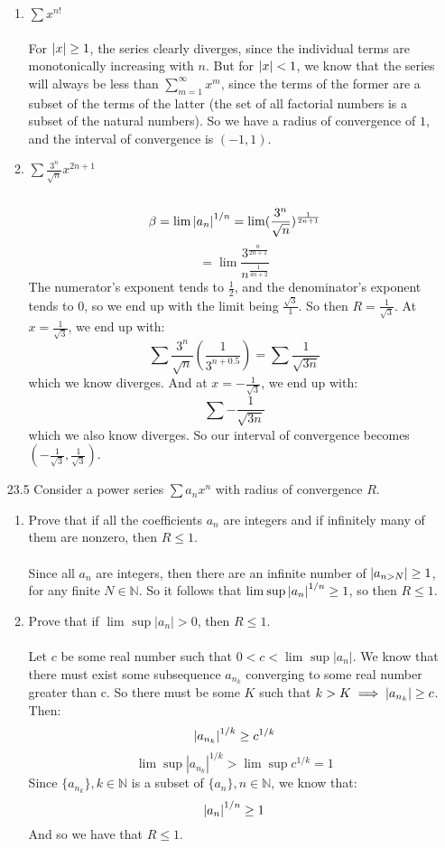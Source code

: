 \begin{enumerate}
\begin{enumerate}
      \item $\sum x^{n!}$\\\\

        For $\left\vert x \right\vert \geq 1$, the series clearly diverges, since the individual terms are monotonically increasing with $n$. But for $\left\vert x \right\vert < 1$, we know that the series will always be less than $\sum_{m=1}^\infty x^m$, since the terms of the former are a subset of the terms of the latter (the set of all factorial numbers is a subset of the natural numbers). So we have a radius of convergence of $1$, and the interval of convergence is $(-1,1)$.
      \item $\sum \frac{3^n}{\sqrt{n}} x^{2n+1}$\\\\

        $$\beta = \lim_{} \left\vert a_n \right\vert^{1/n} = \lim_{} (\frac{3^n}{\sqrt{n}})^{\frac{1}{2n+1}}$$
        $$=\lim_{} \frac{3^{\frac{n}{2n+1}}}{n^{\frac{1}{4n+2}}}$$
        The numerator's exponent tends to $\frac{1}{2}$, and the denominator's exponent tends to $0$, so we end up with the limit being $\frac{\sqrt{3}}{1}$. So then $R = \frac{1}{\sqrt{3}}$. At $x = \frac{1}{\sqrt{3}}$, we end up with:
        $$\sum \frac{3^n}{\sqrt{n}} (\frac{1}{3^{n + 0.5}}) = \sum \frac{1}{\sqrt{3n}}$$
        which we know diverges. And at $x = - \frac{1}{\sqrt{3}}$, we end up with:
        $$\sum - \frac{1}{\sqrt{3n}}$$
        which we also know diverges. So our interval of convergence becomes $(- \frac{1}{\sqrt{3}}, \frac{1}{\sqrt{3}})$.
    \end{enumerate}
  \item [23.5]
    Consider a power series $\sum a_n x^n$ with radius of convergence $R$.
    \begin{enumerate}
      \item Prove that if all the coefficients $a_n$ are integers and if infinitely many of them are nonzero, then $R \leq 1$.\\\\

        Since all $a_n$ are integers, then there are an infinite number of $\left\vert a_{n > N} \right\vert \geq 1$, for any finite $N \in \mathds{N}$. So it follows that $\lim_{} \sup \left\vert a_n \right\vert^{1/n} \geq 1$, so then $R \leq 1$.
      \item Prove that if $\lim_{} \sup |a_n| > 0$, then $R \leq 1$.\\\\

        Let $c$ be some real number such that $0 < c < \lim_{} \sup |a_n|$. We know that there must exist some subsequence $a_{n_k}$ converging to some real number greater than c. So there must be some $K$ such that $k > K \implies \left\vert a_{n_k} \right\vert \geq c$. Then:
        $$\left\vert a_{n_k} \right\vert^{1/k} \geq c^{1/k}$$
        $$\lim_{} \sup |a_{n_k}|^{1/k} > \lim_{} \sup c^{1/k} = 1$$
        Since $\{ a_{n_k} \}, k \in \mathds{N}$ is a subset of $\{ a_n \}, n \in \mathds{N}$, we know that:
        $$\left\vert a_n \right\vert^{1/n} \geq 1$$
        And so we have that $R \leq 1$.
        

\end{enumerate}
\end{enumerate}

